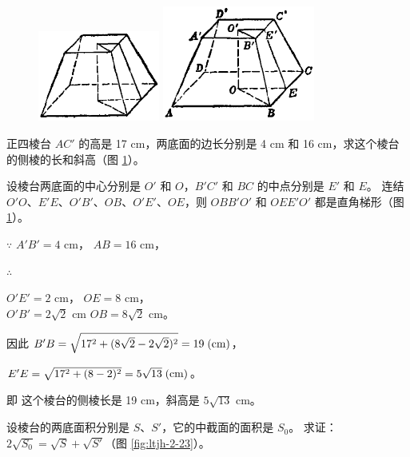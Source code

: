 \begin{enhancedline}
\begin{figure}[htbp]
    \centering
    \begin{minipage}[b]{7cm}
        \centering
        \includegraphics[width=4cm]{../pic/ltjh-ch2-21.png}
        \caption{}\label{fig:ltjh-2-21}
    \end{minipage}
    \qquad
    \begin{minipage}[b]{7cm}
        \centering
        \includegraphics[width=5cm]{../pic/ltjh-ch2-22.png}
        \caption{}\label{fig:ltjh-2-22}
    \end{minipage}
\end{figure}

\liti 正四棱台 $AC'$ 的高是 17 cm，两底面的边长分别是 4 cm 和 16 cm，求这个棱台的侧棱的长和斜高（图 \ref{fig:ltjh-2-22}）。

\jie 设棱台两底面的中心分别是 $O'$ 和 $O$，$B'C'$ 和 $BC$ 的中点分别是 $E'$ 和 $E$。
连结 $O'O$、$E'E$、$O'B'$、$OB$、$O'E'$、$OE$，则 $OBB'O'$ 和 $OEE'O'$ 都是直角梯形（图 \ref{fig:ltjh-2-22}）。

$\because$ \quad $A'B' = 4$ cm， \quad $AB = 16$ cm，

$\therefore$ \quad \begin{zmtblr}[t]{}
    $O'E' = 2$ cm， \quad $OE = 8$ cm， \\
    $O'B' = 2\sqrt{2}$ cm  \quad $OB = 8\sqrt{2}$ cm。
\end{zmtblr}

因此 $B'B = \sqrt{17^2 + (8\sqrt{2} - 2\sqrt{2})^2} = 19 \;(\mathord{\text{cm}})$，

$E'E = \sqrt{17^2 + (8 - 2)^2} = 5\sqrt{13}\;(\mathord{\text{cm}})$。

\hspace*{-2em}即 \quad 这个棱台的侧棱长是 19 cm，斜高是 $5\sqrt{13}$ cm。


\liti 设棱台的两底面积分别是 $S$、$S'$，它的中截面的面积是 $S_0$。
求证： $2\sqrt{S_0} = \sqrt{S} + \sqrt{S'}$（图 \ref{fig:ltjh-2-23}）。


\end{enhancedline}
